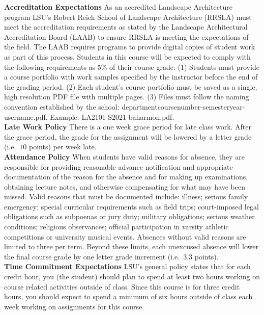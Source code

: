 \documentclass[11pt,article,oneside]{memoir}
\begin{document}
\noindent \textbf{Accreditation Expectations}
As an accredited Landscape Architecture program
LSU's Robert Reich School of Landscape Architecture (RRSLA)
must meet the accreditation requirements
as stated by the Landscape Architectural Accreditation
Board (LAAB) to ensure RRSLA is meeting the expectations of the field.
The LAAB requires programs to provide digital copies
of student work as part of this process.
Students in this course will be expected
to comply with the following requirements
as 5\% of their course grade:
(1) Students must provide a course portfolio
with work samples specified by the instructor
before the end of the grading period.
(2) Each student's course portfolio must be saved as
a single, high resolution PDF file with multiple pages.
(3) Files must follow the naming convention
established by the school: departmentcoursenumber-semesteryear-username.pdf.
Example: LA2101-S2021-baharmon.pdf.\\

\noindent \textbf{Late Work Policy}
There is a one week grace period for late class work. 
After the grace period, 
the grade for the assignment will be lowered by
a letter grade (i.e.~$10$ points) per week late.\\

\noindent \textbf{Attendance Policy}
When students have valid reasons for absence, they are responsible for providing reasonable advance notification and appropriate documentation of the reason for the absence and for making up examinations, obtaining lecture notes, and otherwise compensating for what may have been missed. Valid reasons that must be documented include: illness; serious family emergency; special curricular requirements such as field trips; court-imposed legal obligations such as subpoenas or jury duty; military obligations; serious weather conditions; religious observances; official participation in varsity athletic competitions or university musical events. Absences without valid reasons are limited to three per term. Beyond these limits, each unexcused absence will lower the final course grade by one letter grade increment (i.e.~$3.\overline{3}$ points).\\

\noindent \textbf{Time Commitment Expectations}
LSU's general policy states that for each credit hour, you (the student) should plan to
spend at least two hours working on course related activities outside of class. Since this course is for three credit hours, you should expect to spend a minimum of six hours outside of class each week working on assignments for this course.\\  
\end{document}
